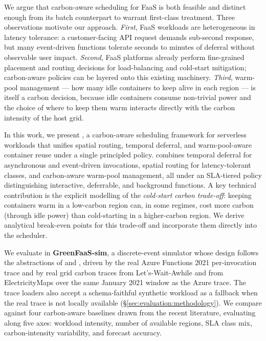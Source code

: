 We argue that carbon-aware scheduling for FaaS is both feasible and
distinct enough from its batch counterpart to warrant first-class
treatment. Three observations motivate our approach. \emph{First},
FaaS workloads are heterogeneous in latency tolerance: a
customer-facing API request demands sub-second response, but many
event-driven functions tolerate seconds to minutes of deferral
without observable user impact. \emph{Second}, FaaS platforms already
perform fine-grained placement and routing decisions for
load-balancing and cold-start mitigation; carbon-aware policies can
be layered onto this existing machinery. \emph{Third}, warm-pool
management --- how many idle containers to keep alive in each region
--- is itself a carbon decision, because idle containers consume
non-trivial power and the choice of where to keep them warm interacts
directly with the carbon intensity of the host grid.

In this work, we present \GreenFaaS, a carbon-aware scheduling
framework for serverless workloads that unifies spatial routing,
temporal deferral, and warm-pool-aware container reuse under a single principled
policy. \GreenFaaS{} combines temporal deferral for asynchronous and
event-driven invocations, spatial routing for latency-tolerant
classes, and carbon-aware warm-pool management, all under an
SLA-tiered policy distinguishing interactive, deferrable, and
background functions. A key technical contribution is the explicit
modelling of the \emph{cold-start carbon trade-off}: keeping
containers warm in a low-carbon region can, in some regimes, cost
more carbon (through idle power) than cold-starting in a
higher-carbon region. We derive analytical break-even points for
this trade-off and incorporate them directly into the scheduler.

We evaluate \GreenFaaS{} in \textbf{GreenFaaS-sim}, a discrete-event
simulator whose design follows the abstractions of 
and  \citep{faassim,vessim}, driven by the real Azure
Functions 2021 per-invocation trace
\citep{zhang2021faster,azuretrace} and by real grid carbon traces from
Let's-Wait-Awhile \citep{wiesner2021lets,lwa} and from
ElectricityMaps over the same January 2021 window as the Azure
trace. The trace loaders also accept a schema-faithful synthetic
workload as a fallback when the real trace is not locally available
(\S\ref{sec:evaluation:methodology}). We compare against four
carbon-aware baselines drawn from the recent literature, evaluating
along five axes: workload intensity, number of available regions, SLA
class mix, carbon-intensity variability, and forecast accuracy.


